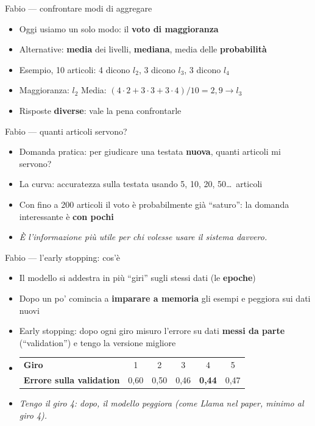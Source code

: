 \documentclass[aspectratio=169]{beamer}
\newcommand{\hl}[1]{\textbf{#1}}
\begin{document}
\begin{frame}{Fabio --- confrontare modi di aggregare}
  \vfill
  \begin{itemize}[<+->]
    \setlength\itemsep{0.8em}
    \item Oggi usiamo un solo modo: il \hl{voto di maggioranza}
    \item Alternative: \hl{media} dei livelli, \hl{mediana}, media delle \hl{probabilit\`a}
    \item Esempio, 10 articoli: 4 dicono $l_2$, 3 dicono $l_3$, 3 dicono $l_4$
    \item[] Maggioranza: $l_2$ \qquad Media: $(4{\cdot}2+3{\cdot}3+3{\cdot}4)/10 = 2{,}9 \rightarrow l_3$
    \item Risposte \hl{diverse}: vale la pena confrontarle
  \end{itemize}
  \vfill
\end{frame}

\begin{frame}{Fabio --- quanti articoli servono?}
  \vfill
  \begin{itemize}[<+->]
    \setlength\itemsep{0.8em}
    \item Domanda pratica: per giudicare una testata \hl{nuova}, quanti articoli mi servono?
    \item La curva: accuratezza sulla testata usando 5, 10, 20, 50\dots\ articoli
    \item Con fino a 200 articoli il voto \`e probabilmente gi\`a ``saturo'': la domanda interessante \`e \hl{con pochi}
    \item[] {\small\itshape \`E l'informazione pi\`u utile per chi volesse usare il sistema davvero.}
  \end{itemize}
  \vfill
\end{frame}

\begin{frame}{Fabio --- l'early stopping: cos'\`e}
  \vfill
  \begin{itemize}[<+->]
    \setlength\itemsep{0.8em}
    \item Il modello si addestra in pi\`u ``giri'' sugli stessi dati (le \hl{epoche})
    \item Dopo un po' comincia a \hl{imparare a memoria} gli esempi e peggiora sui dati nuovi
    \item Early stopping: dopo ogni giro misuro l'errore su dati \hl{messi da parte} (``validation'') e tengo la versione migliore
    \item[] {\small\begin{tabular}{lccccc}
      \toprule
      \textbf{Giro} & 1 & 2 & 3 & 4 & 5 \\
      \textbf{Errore sulla validation} & 0,60 & 0,50 & 0,46 & \hl{0,44} & 0,47 \\
      \bottomrule
    \end{tabular}}
    \item[] {\small\itshape Tengo il giro 4: dopo, il modello peggiora (come Llama nel paper, minimo al giro 4).}
  \end{itemize}
  \vfill
\end{frame}
\end{document}
